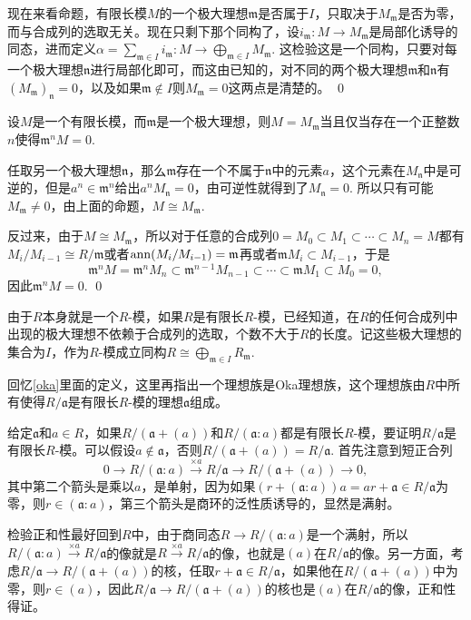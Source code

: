	现在来看命题，有限长模$M$的一个极大理想$\mathfrak{m}$是否属于$I$，只取决于$M_\mathfrak{m}$是否为零，而与合成列的选取无关。现在只剩下那个同构了，设$i_\mathfrak{m}:M\to M_{\mathfrak{m}}$是局部化诱导的同态，进而定义$\alpha=\sum_{\mathfrak{m}\in I}i_{\mathfrak{m}}:M\to \bigoplus_{\mathfrak{m}\in I} M_{\mathfrak{m}}$. 这检验这是一个同构，只要对每一个极大理想$\mathfrak{n}$进行局部化即可，而这由已知的，对不同的两个极大理想$\mathfrak{m}$和$\mathfrak{n}$有$(M_\mathfrak{m})_\mathfrak{n}=0$，以及如果$\mathfrak{m}\not\in I$则$M_\mathfrak{m}=0$这两点是清楚的。
\qed

\pro 设$M$是一个有限长模，而$\mathfrak{m}$是一个极大理想，则$M=M_{\mathfrak{m}}$当且仅当存在一个正整数$n$使得$\mathfrak{m}^nM=0$.

\proof
	任取另一个极大理想$\mathfrak{n}$，那么$\mathfrak{m}$存在一个不属于$\mathfrak{n}$中的元素$a$，这个元素在$M_\mathfrak{n}$中是可逆的，但是$a^n\in \mathfrak{m}^n$给出$a^nM_\mathfrak{n}=0$，由可逆性就得到了$M_\mathfrak{n}=0$. 所以只有可能$M_\mathfrak{m}\neq 0$，由上面的命题，$M\cong M_\mathfrak{m}$.

	反过来，由于$M\cong M_\mathfrak{m}$，所以对于任意的合成列$0=M_0\subset M_1\subset \cdots\subset M_n=M$都有$M_i/M_{i-1}\cong R/\mathfrak{m}$或者$\operatorname{ann}(M_i/M_{i-1})=\mathfrak{m}$再或者$\mathfrak{m}M_{i}\subset M_{i-1}$，于是
	\[
	\mathfrak{m}^nM=\mathfrak{m}^nM_{n}\subset \mathfrak{m}^{n-1}M_{n-1}\subset \cdots \subset \mathfrak{m}M_1\subset M_0=0,
	\]
	因此$\mathfrak{m}^nM=0$.
\qed

\para 由于$R$本身就是一个$R$-模，如果$R$是有限长$R$-模，已经知道，在$R$的任何合成列中出现的极大理想不依赖于合成列的选取，个数不大于$R$的长度。记这些极大理想的集合为$I$，作为$R$-模成立同构$R\cong\bigoplus_{\mathfrak{m}\in I}R_\mathfrak{m}$.

\lem 回忆\eqref{oka}里面的定义，这里再指出一个理想族是Oka理想族，这个理想族由$R$中所有使得$R/\mathfrak{a}$是有限长$R$-模的理想$\mathfrak{a}$组成。

\proof 
	给定$\mathfrak{a}$和$a\in R$，如果$R/(\mathfrak{a}+(a))$和$R/(\mathfrak{a}:a)$都是有限长$R$-模，要证明$R/\mathfrak{a}$是有限长$R$-模。可以假设$a\not\in \mathfrak{a}$，否则$R/(\mathfrak{a}+(a))=R/\mathfrak{a}$. 首先注意到短正合列
	\[
		0\to R/(\mathfrak{a}:a)\xrightarrow{\times a} R/\mathfrak{a} \to R/(\mathfrak{a}+(a))\to 0,
	\]
	其中第二个箭头是乘以$a$，是单射，因为如果$(r+(\mathfrak{a}:a))a=ar+\mathfrak{a}\in R/\mathfrak{a}$为零，则$r\in (\mathfrak{a}:a)$，第三个箭头是商环的泛性质诱导的，显然是满射。

	检验正和性最好回到$R$中，由于商同态$R\to R/(\mathfrak{a}:a)$是一个满射，所以$R/(\mathfrak{a}:a)\xrightarrow{\times a} R/\mathfrak{a}$的像就是$R\xrightarrow{\times a} R/\mathfrak{a}$的像，也就是$(a)$在$R/\mathfrak{a}$的像。另一方面，考虑$R/\mathfrak{a} \to R/(\mathfrak{a}+(a))$的核，任取$r+\mathfrak{a}\in R/\mathfrak{a}$，如果他在$R/(\mathfrak{a}+(a))$中为零，则$r\in (a)$，因此$R/\mathfrak{a} \to R/(\mathfrak{a}+(a))$的核也是$(a)$在$R/\mathfrak{a}$的像，正和性得证。

